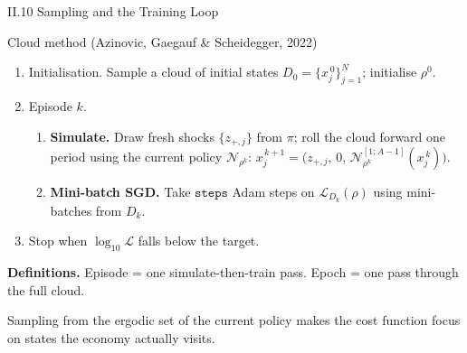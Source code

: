 \documentclass[aspectratio=169,11pt]{beamer}
\newcommand{\emphc}[1]{\textcolor{harvardcrimson}{#1}}
\newcommand{\N}{\mathcal{N}}
\newcommand{\Loss}{\mathcal{L}}
\begin{document}
\begin{frame}{II.10 Sampling and the Training Loop}
\small
\begin{block}{Cloud method (Azinovic, Gaegauf \& Scheidegger, 2022)}
\vspace{-2pt}
\begin{enumerate}\itemsep2pt
    \item \emphc{Initialisation.}  Sample a cloud of initial states $D_0 = \{x_j^{\,0}\}_{j=1}^{N}$; initialise $\rho^0$.
    \item \emphc{Episode $k$.}
    \begin{enumerate}
        \item[(a)] \textbf{Simulate.}  Draw fresh shocks $\{z_{+,j}\}$ from $\pi$; roll the cloud forward one period using the \emphc{current} policy $\N_{\rho^k}$:
        $x_j^{\,k+1} = \bigl(z_{+,j},\,0,\,\N_{\rho^k}^{[1:A-1]}(x_j^{\,k})\bigr)$.
        \item[(b)] \textbf{Mini-batch SGD.}  Take $\texttt{steps}$ Adam steps on $\Loss_{D_k}(\rho)$ using mini-batches from $D_k$.
    \end{enumerate}
    \item \emphc{Stop} when $\log_{10} \Loss$ falls below the target.
\end{enumerate}
\end{block}

\vspace{0.2em}
\textbf{Definitions.}  \emphc{Episode} = one simulate-then-train pass.  \emphc{Epoch} = one pass through the full cloud.

\vspace{0.3em}
{\footnotesize Sampling from the ergodic set of the current policy makes the cost function focus on states the economy actually visits.}
\end{frame}
\end{document}
